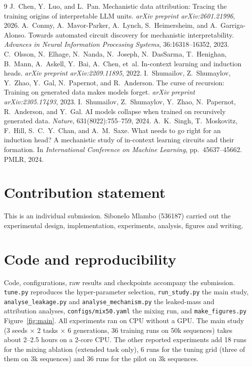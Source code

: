 \documentclass[10pt,a4paper]{article}
\begin{document}
\clearpage
\begin{thebibliography}{9}\small
{} J.~Chen, Y.~Luo, and L.~Pan. Mechanistic data attribution: Tracing the training origins of interpretable LLM units. \emph{arXiv preprint arXiv:2601.21996}, 2026.
 A.~Conmy, A.~Mavor-Parker, A.~Lynch, S.~Heimersheim, and A.~Garriga-Alonso. Towards automated circuit discovery for mechanistic interpretability. \emph{Advances in Neural Information Processing Systems}, 36:16318--16352, 2023.
 C.~Olsson, N.~Elhage, N.~Nanda, N.~Joseph, N.~DasSarma, T.~Henighan, B.~Mann, A.~Askell, Y.~Bai, A.~Chen, et~al. In-context learning and induction heads. \emph{arXiv preprint arXiv:2209.11895}, 2022.
 I.~Shumailov, Z.~Shumaylov, Y.~Zhao, Y.~Gal, N.~Papernot, and R.~Anderson. The curse of recursion: Training on generated data makes models forget. \emph{arXiv preprint arXiv:2305.17493}, 2023.
 I.~Shumailov, Z.~Shumaylov, Y.~Zhao, N.~Papernot, R.~Anderson, and Y.~Gal. AI models collapse when trained on recursively generated data. \emph{Nature}, 631(8022):755--759, 2024.
 A.~K.~Singh, T.~Moskovitz, F.~Hill, S.~C.~Y.~Chan, and A.~M.~Saxe. What needs to go right for an induction head? A mechanistic study of in-context learning circuits and their formation. In \emph{International Conference on Machine Learning}, pp.~45637--45662. PMLR, 2024.
\end{thebibliography}

\section*{Contribution statement}
This is an individual submission. Sibonelo Mlambo (536187) carried out the experimental design, implementation, experiments, analysis, figures and writing.

\section*{Code and reproducibility}
Code, configurations, raw results and checkpoints accompany the submission. \texttt{tune.py} reproduces the hyper-parameter selection, \texttt{run\_study.py} the main study, \texttt{analyse\_leakage.py} and \texttt{analyse\_mechanism.py} the leaked-mass and attribution analyses, \texttt{configs/mix50.yaml} the mixing run, and \texttt{make\_figures.py} Figure~\ref{fig:main}. All experiments ran on CPU without a GPU. The main study (3 seeds $\times$ 2 tasks $\times$ 6 generations, 36 training runs on 50k sequences) takes about 2--2.5 hours on a 2-core CPU. The other reported experiments add 18 runs for the mixing ablation (extended task only), 6 runs for the tuning grid (three of them on 3k sequences) and 36 runs for the pilot on 3k sequences.
\end{document}
